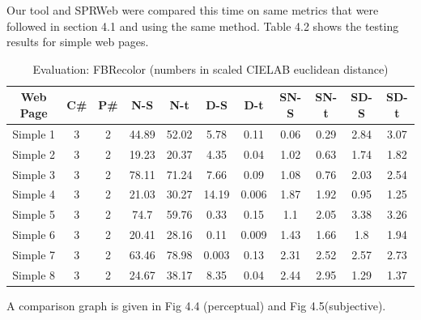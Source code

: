 Our tool and SPRWeb were compared this time on same metrics that were followed in section 4.1 and using the same method. Table 4.2 shows the testing results for simple web pages. 


\begin{table}[!htb]
\caption{Evaluation: FBRecolor (numbers in scaled CIELAB euclidean distance)}
\centering
\begin{tabular}{c c c c c c c c c c c}
\hline\hline
Web Page & C\# & P\# & N-S & N-t & D-S & D-t & SN-S & SN-t & SD-S & SD-t\\ [0.5ex]
\hline
Simple 1&3&2&44.89&52.02&5.78&0.11&0.06&0.29&2.84&3.07\\
Simple 2&3&2&19.23&20.37&4.35&0.04&1.02&0.63&1.74&1.82\\
Simple 3&3&2&78.11&71.24&7.66&0.09&1.08&0.76&2.03&2.54\\
Simple 4&3&2&21.03&30.27&14.19&0.006&1.87&1.92&0.95&1.25\\
Simple 5&3&2&74.7&59.76&0.33&0.15&1.1&2.05&3.38&3.26\\
Simple 6&3&2&20.41&28.16&0.11&0.009&1.43&1.66&1.8&1.94\\
Simple 7&3&2&63.46&78.98&0.003&0.13&2.31&2.52&2.57&2.73\\
Simple 8&3&2&24.67&38.17&8.35&0.04&2.44&2.95&1.29&1.37\\[1ex]
\hline
\end{tabular}
\label{table:nonlin}
\end{table}

A comparison graph is given in Fig 4.4 (perceptual) and Fig 4.5(subjective).

